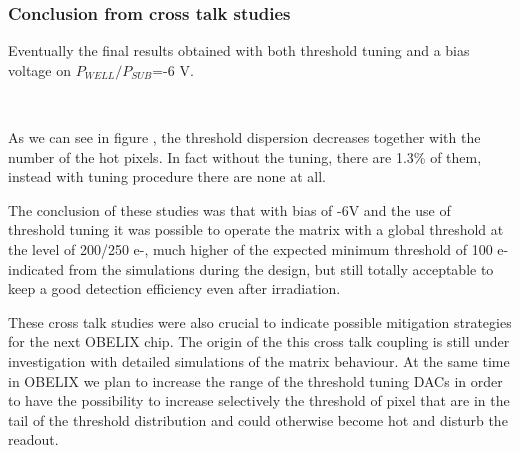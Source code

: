 \subsubsection{Conclusion from cross talk studies}

Eventually the final results obtained with both threshold tuning and a bias voltage on $P_{WELL}/P_{SUB}$=-6 V. 

\begin{figure}[h!]
\centering
{}\quad
{}\\
\label{fig:bias_tuning}
\end{figure}

As we can see in figure , the threshold dispersion decreases together with the number of the hot pixels. In fact without the tuning, there are 1.3\% of them, instead with tuning procedure there are none at all.

The conclusion of these studies was that with bias of -6V and the use of threshold tuning it was possible to operate the matrix with a global threshold at the level of 200/250 e-, much higher of the expected minimum threshold of 100 e- indicated from the simulations during the design, but still totally acceptable to keep a good detection efficiency even after irradiation. 

These cross talk studies were also crucial to indicate possible mitigation strategies for the next OBELIX chip. 
The origin of the this cross talk coupling is still under investigation with detailed simulations of the matrix behaviour. At the same time in OBELIX we plan to increase the range of the threshold tuning DACs in order to have the possibility to increase selectively the threshold of pixel that are in the tail of the threshold distribution and could otherwise become hot and disturb the readout. 




\begin{comment}
Suggestions from OBELIX meeting.

Probably the coupling is linked to digital power. 
Not from the bulk: +4 clk seems to be the indication for not a direct coupling

Since the distribution of the power is from the edge,  first and last column should be more solid against this effect and hot pixel should be more present in the center? 
They asked if we have a  map of the hot pixels

Also suggested to change the clock and see if the delay from the FREEZE edge is at the same delay or not. 

\end{comment}




